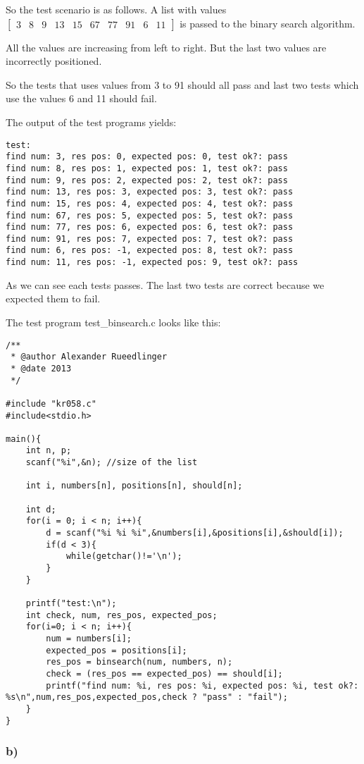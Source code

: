 \documentclass[12pt]{article}
\begin{document}
So the test scenario is as follows. A list with values $\begin{bmatrix}
3 & 8 & 9 & 13 & 15 & 67 & 77 & 91 & 6 & 11
\end{bmatrix} $ is passed to the binary search algorithm.

All the values are increasing from left to right. But the last two values are incorrectly positioned.

So the tests that uses values from 3 to 91 should all pass and last two tests which use the values 6 and 11 should fail.

The output of the test programs yields:
\begin{lstlisting}
test:
find num: 3, res pos: 0, expected pos: 0, test ok?: pass
find num: 8, res pos: 1, expected pos: 1, test ok?: pass
find num: 9, res pos: 2, expected pos: 2, test ok?: pass
find num: 13, res pos: 3, expected pos: 3, test ok?: pass
find num: 15, res pos: 4, expected pos: 4, test ok?: pass
find num: 67, res pos: 5, expected pos: 5, test ok?: pass
find num: 77, res pos: 6, expected pos: 6, test ok?: pass
find num: 91, res pos: 7, expected pos: 7, test ok?: pass
find num: 6, res pos: -1, expected pos: 8, test ok?: pass
find num: 11, res pos: -1, expected pos: 9, test ok?: pass
\end{lstlisting} 

As we can see each tests passes. The last two tests are correct because we expected them to fail.

The test program test\_binsearch.c looks like this:
\begin{lstlisting}
/**
 * @author Alexander Rueedlinger
 * @date 2013
 */

#include "kr058.c"
#include<stdio.h>

main(){
	int n, p;
	scanf("%i",&n); //size of the list

	int i, numbers[n], positions[n], should[n];	
	
	int d;
	for(i = 0; i < n; i++){
		d = scanf("%i %i %i",&numbers[i],&positions[i],&should[i]);
		if(d < 3){
			while(getchar()!='\n');	
		}
	}

	printf("test:\n");
	int check, num, res_pos, expected_pos;
	for(i=0; i < n; i++){
		num = numbers[i];
		expected_pos = positions[i];
		res_pos = binsearch(num, numbers, n);
		check = (res_pos == expected_pos) == should[i]; 
		printf("find num: %i, res pos: %i, expected pos: %i, test ok?: %s\n",num,res_pos,expected_pos,check ? "pass" : "fail");
	}
}
\end{lstlisting}
\subsubsection*{b)}
\end{document}
